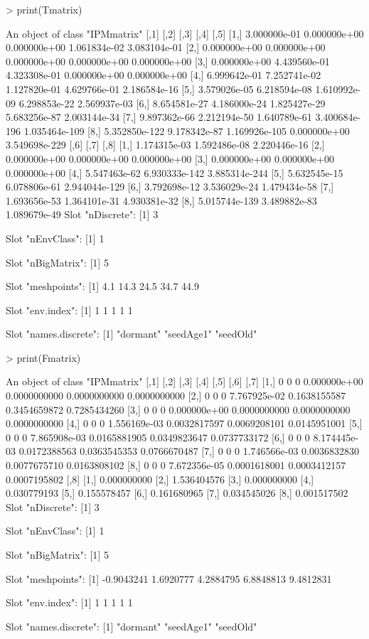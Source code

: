 \documentclass{article}
\begin{document}
\begin{Schunk}
\begin{Sinput}
> print(Tmatrix)
\end{Sinput}
\begin{Soutput}
An object of class "IPMmatrix"
              [,1]         [,2]          [,3]          [,4]          [,5]
[1,]  3.000000e-01 0.000000e+00  0.000000e+00  1.061834e-02  3.083104e-01
[2,]  0.000000e+00 0.000000e+00  0.000000e+00  0.000000e+00  0.000000e+00
[3,]  0.000000e+00 4.439560e-01  4.323308e-01  0.000000e+00  0.000000e+00
[4,]  6.999642e-01 7.252741e-02  1.127820e-01  4.629766e-01  2.186584e-16
[5,]  3.579026e-05 6.218594e-08  1.610992e-09  6.298853e-22  2.569937e-03
[6,]  8.654581e-27 4.186000e-24  1.825427e-29  5.683256e-87  2.003144e-34
[7,]  9.897362e-66 2.212194e-50  1.640789e-61 3.400684e-196 1.035464e-109
[8,] 5.352850e-122 9.178342e-87 1.169926e-105  0.000000e+00 3.549698e-229
              [,6]          [,7]          [,8]
[1,]  1.174315e-03  1.592486e-08  2.220446e-16
[2,]  0.000000e+00  0.000000e+00  0.000000e+00
[3,]  0.000000e+00  0.000000e+00  0.000000e+00
[4,]  5.547463e-62 6.930333e-142 3.885314e-244
[5,]  5.632545e-15  6.078806e-61 2.944044e-129
[6,]  3.792698e-12  3.536029e-24  1.479434e-58
[7,]  1.693656e-53  1.364101e-31  4.930381e-32
[8,] 5.015744e-139  3.489882e-83  1.089679e-49
Slot "nDiscrete":
[1] 3

Slot "nEnvClass":
[1] 1

Slot "nBigMatrix":
[1] 5

Slot "meshpoints":
[1]  4.1 14.3 24.5 34.7 44.9

Slot "env.index":
[1] 1 1 1 1 1

Slot "names.discrete":
[1] "dormant"  "seedAge1" "seedOld" 
\end{Soutput}
\begin{Sinput}
> print(Fmatrix)
\end{Sinput}
\begin{Soutput}
An object of class "IPMmatrix"
     [,1] [,2] [,3]         [,4]         [,5]         [,6]         [,7]
[1,]    0    0    0 0.000000e+00 0.0000000000 0.0000000000 0.0000000000
[2,]    0    0    0 7.767925e-02 0.1638155587 0.3454659872 0.7285434260
[3,]    0    0    0 0.000000e+00 0.0000000000 0.0000000000 0.0000000000
[4,]    0    0    0 1.556169e-03 0.0032817597 0.0069208101 0.0145951001
[5,]    0    0    0 7.865908e-03 0.0165881905 0.0349823647 0.0737733172
[6,]    0    0    0 8.174445e-03 0.0172388563 0.0363545353 0.0766670487
[7,]    0    0    0 1.746566e-03 0.0036832830 0.0077675710 0.0163808102
[8,]    0    0    0 7.672356e-05 0.0001618001 0.0003412157 0.0007195802
            [,8]
[1,] 0.000000000
[2,] 1.536404576
[3,] 0.000000000
[4,] 0.030779193
[5,] 0.155578457
[6,] 0.161680965
[7,] 0.034545026
[8,] 0.001517502
Slot "nDiscrete":
[1] 3

Slot "nEnvClass":
[1] 1

Slot "nBigMatrix":
[1] 5

Slot "meshpoints":
[1] -0.9043241  1.6920777  4.2884795  6.8848813  9.4812831

Slot "env.index":
[1] 1 1 1 1 1

Slot "names.discrete":
[1] "dormant"  "seedAge1" "seedOld" 
\end{Soutput}
\end{Schunk}
\end{document}
